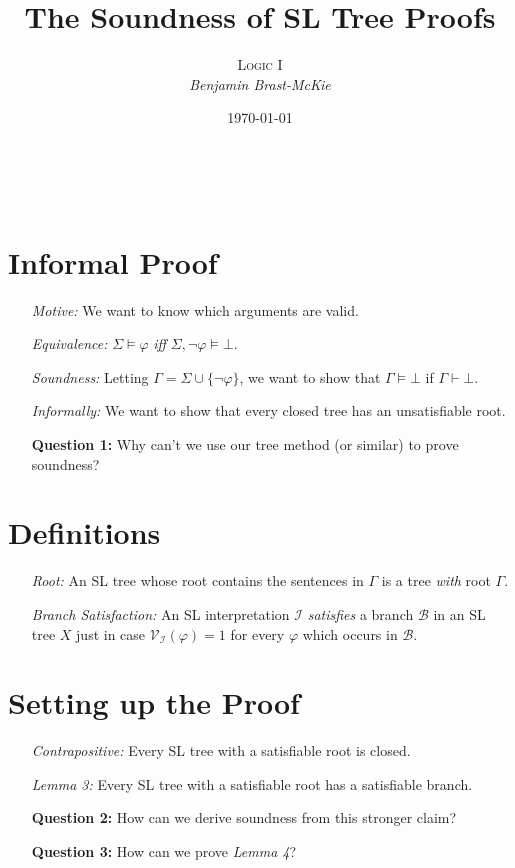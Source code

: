 \documentclass[a4paper, 11pt]{article} %
\title{\textbf{The Soundness of SL Tree Proofs}} %
\author{\textsc{Logic I}\\ \em Benjamin Brast-McKie} %
\date{\today} %
\makeatletter
\newcommand{\set}[1]{\lbrace#1\rbrace} %
\newcommand{\I}{\mathcal{I}}
\newcommand{\B}{\mathcal{B}}
\newcommand{\V}[1]{\mathcal{V}_{#1}} %
\renewcommand{\maketitle}{ %
\begin{flushright} %
{\LARGE\@title} %

\vspace{10pt} %

{\@author} %
\\\@date %

\vspace{10pt} %
\end{flushright}
}
\makeatother
\begin{document}
\maketitle %

\thispagestyle{empty}


\section*{Informal Proof}

\begin{enumerate}
  \item[\it Motive:] We want to know which arguments are valid.
  \item[\it Equivalence:] $\Sigma \vDash \varphi$ \textit{iff} $\Sigma, \neg \varphi \vDash \bot$.
  \item[\it Soundness:] Letting $\Gamma=\Sigma\cup\set{\neg\varphi}$, we want to show that $\Gamma \vDash \bot$ if $\Gamma \vdash \bot$.
  \item[\it Informally:] We want to show that every closed tree has an unsatisfiable root.
  \item[\bf Question 1:] Why can't we use our tree method (or similar) to prove soundness?
\end{enumerate}



\section*{Definitions}

\begin{enumerate}
  \item[\it Root:] An SL tree whose root contains the sentences in $\Gamma$ is a tree \textit{with} root $\Gamma$. 
  \item[\it Branch Satisfaction:] An SL interpretation $\I$ \textit{satisfies} a branch $\B$ in an SL tree $X$ just in case $\V{\I}(\varphi)=1$ for every $\varphi$ which occurs in $\B$.
\end{enumerate}




\section*{Setting up the Proof}

\begin{enumerate}
  \item[\it Contrapositive:] Every SL tree with a satisfiable root is closed.
  \item[\it Lemma 3:] Every SL tree with a satisfiable root has a satisfiable branch.
  \item[\bf Question 2:] How can we derive soundness from this stronger claim?
  \item[\bf Question 3:] How can we prove \textit{Lemma 4}?
\end{enumerate}
\end{document}
